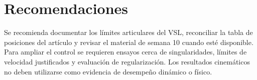 \section{Recomendaciones}
Se recomienda documentar los límites articulares del VSL, reconciliar la tabla de posiciones del artículo y revisar el material de semana 10 cuando esté disponible. Para ampliar el control se requieren ensayos cerca de singularidades, límites de velocidad justificados y evaluación de regularización. Los resultados cinemáticos no deben utilizarse como evidencia de desempeño dinámico o físico.
